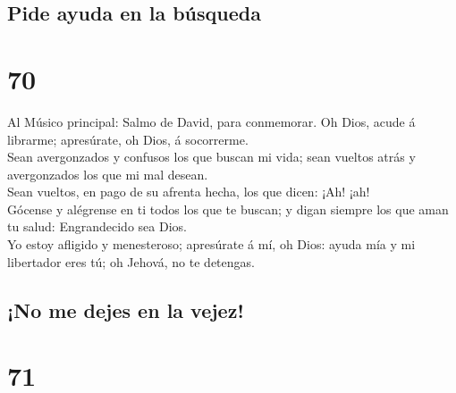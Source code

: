 \hypertarget{pide-ayuda-en-la-buxfasqueda}{%
\subsection{Pide ayuda en la
búsqueda}\label{pide-ayuda-en-la-buxfasqueda}}

\hypertarget{section-69}{%
\section{70}\label{section-69}}

 Al Músico principal: Salmo de David, para conmemorar. Oh
Dios, acude á librarme; apresúrate, oh Dios, á socorrerme.\\
 Sean avergonzados y confusos los que buscan mi vida; sean
vueltos atrás y avergonzados los que mi mal desean.\\
 Sean vueltos, en pago de su afrenta hecha, los que dicen:
¡Ah! ¡ah!\\
 Gócense y alégrense en ti todos los que te buscan; y
digan siempre los que aman tu salud: Engrandecido sea Dios.\\
 Yo estoy afligido y menesteroso; apresúrate á mí, oh
Dios: ayuda mía y mi libertador eres tú; oh Jehová, no te detengas.

\hypertarget{no-me-dejes-en-la-vejez}{%
\subsection{¡No me dejes en la vejez!}\label{no-me-dejes-en-la-vejez}}

\hypertarget{section-70}{%
\section{71}\label{section-70}}

